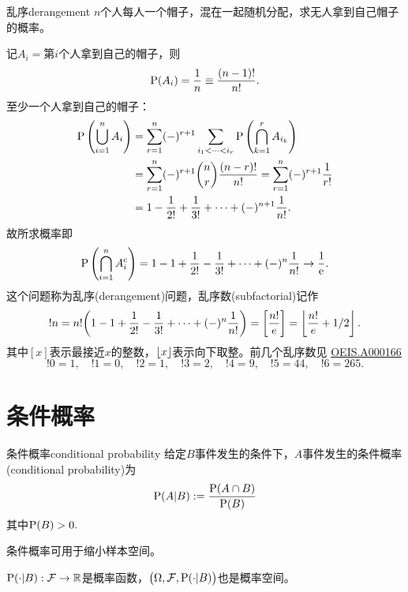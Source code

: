 \begin{example}{乱序}{derangement}
	$n$个人每人一个帽子，混在一起随机分配，求无人拿到自己帽子的概率。

	记$A_i=$第$i$个人拿到自己的帽子，则
	\[
		\P(A_i)=\frac1n\equiv\frac{(n-1)!}{n!}.
	\]
	至少一个人拿到自己的帽子：
	\begin{align*}
		\P\kh{\bigcup_{i=1}^nA_i}&=\sum_{r=1}^n(-)^{r+1}\sum_{i_1<\cdots<i_r}\P\kh{\bigcap_{k=1}^rA_{i_k}}\\
		&=\sum_{r=1}^n(-)^{r+1}\binom nr\frac{(n-r)!}{n!}=\sum_{r=1}^n(-)^{r+1}\frac1{r!}\\
		&=1-\frac1{2!}+\frac1{3!}+\cdots+(-)^{n+1}\frac1{n!}.
	\end{align*}
	故所求概率即
	\[
		\P\kh{\bigcap_{i=1}^nA_i\c}=1-1+\frac1{2!}-\frac1{3!}+\cdots+(-)^n\frac1{n!}\to\frac1{\e{}}.
	\]
	\tcblower
	这个问题称为乱序(derangement)问题，乱序数(subfactorial)记作
	\begin{equation}
		\label{eq:subfactorial}
		!n=n!\biggkh{1-1+\frac1{2!}-\frac1{3!}+\cdots+(-)^n\frac1{n!}}=\biggfkh{\frac{n!}e}=\floor{\frac{n!}e+1/2}.
	\end{equation}
	其中$[x]$表示最接近$x$的整数，$\floor x$表示向下取整。前几个乱序数见 \href{https://oeis.org/A000166}{OEIS.A000166}
	\[
		!0=1,\quad !1=0,\quad !2=1,\quad !3=2,\quad !4=9,\quad !5=44,\quad !6=265.%
	\]	
\end{example}

\section{条件概率}

\begin{definition}{条件概率}{conditional probability}
	给定$B$事件发生的条件下，$A$事件发生的条件概率(conditional probability)为
	\begin{equation}
		\P(A|B):=\frac{\P(A\cap B)}{\P(B)}
	\end{equation}
	其中$\P(B)>0.$
\end{definition}

\begin{remark}
	条件概率可用于缩小样本空间。
\end{remark}

\begin{corollary}
	$\P(\cdot|B):\cF\to\RR$是概率函数，$\bigkh{\Omega,\cF,\P(\cdot|B)}$也是概率空间。
\end{corollary}

